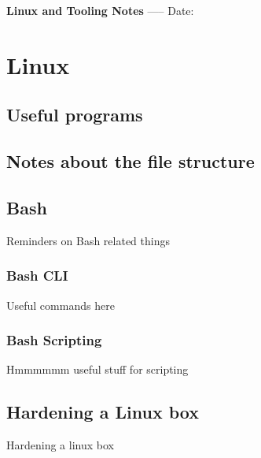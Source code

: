 \documentclass[a4paper, 11pt]{book}
\begin{document}
    \begin{titlepage}
        \centering
        \vspace*{2in}
        \Huge \textbf{Linux and Tooling Notes}
        \vfill
        \Large -----
        \vfill
        \Large Date:%
    \end{titlepage}

    \tableofcontents
    \newpage



    \chapter{Linux}


    \section{Useful programs}


    \section{Notes about the file structure}


    \section{Bash}
    Reminders on Bash related things

    \subsection{Bash CLI}
    Useful commands here

    \subsection{Bash Scripting}
    Hmmmmmm useful stuff for scripting


    \section{Hardening a Linux box}
    Hardening a linux box

\end{document}
